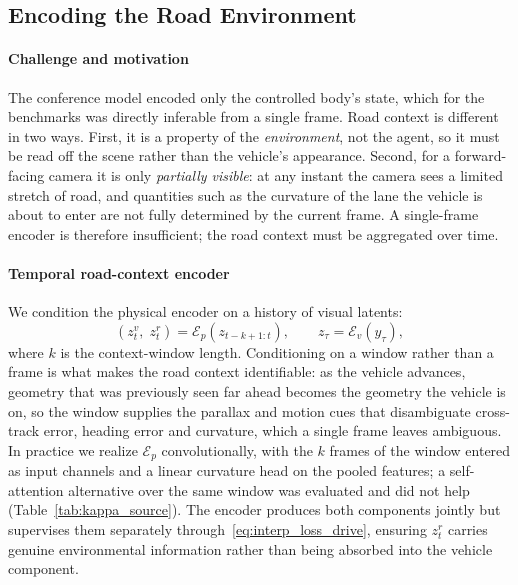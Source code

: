 \documentclass[preprint,12pt]{elsarticle}
\newcommand{\zv}{z^{v}}      %
\newcommand{\zr}{z^{r}}      %
\begin{document}
\subsection{Encoding the Road Environment}\label{sec:encoding}  %

\paragraph{Challenge and motivation}
The conference model encoded only the controlled body's state, which for the
benchmarks was directly inferable from a single frame.
Road context is different in two ways.
First, it is a property of the \emph{environment}, not the agent, so it must be
read off the scene rather than the vehicle's appearance.
Second, for a forward-facing camera it is only \emph{partially visible}: at any
instant the camera sees a limited stretch of road, and quantities such as the
curvature of the lane the vehicle is about to enter are not fully determined by
the current frame.
A single-frame encoder is therefore insufficient; the road context must be
aggregated over time.

\paragraph{Temporal road-context encoder}
We condition the physical encoder on a history of visual latents:
\begin{equation}
    (\zv_t,\; \zr_t) = \mathcal{E}_p(z_{t-k+1:t}),
    \qquad z_{\tau} = \mathcal{E}_v(y_{\tau}),
    \label{eq:temporal_encoder}
\end{equation}
where $k$ is the context-window length.
Conditioning on a window rather than a frame is what makes the road context
identifiable: as the vehicle advances, geometry that was previously seen far ahead
becomes the geometry the vehicle is on, so the window supplies the parallax and
motion cues that disambiguate cross-track error, heading error and curvature,
which a single frame leaves ambiguous.
In practice we realize $\mathcal{E}_p$ convolutionally, with the $k$ frames of the
window entered as input channels and a linear curvature head on the pooled
features; a self-attention alternative over the same window was evaluated and did
not help (Table~\ref{tab:kappa_source}).
The encoder produces both components jointly but supervises them separately
through~\eqref{eq:interp_loss_drive}, ensuring $\zr_t$ carries genuine
environmental information rather than being absorbed into the vehicle component.
\end{document}
